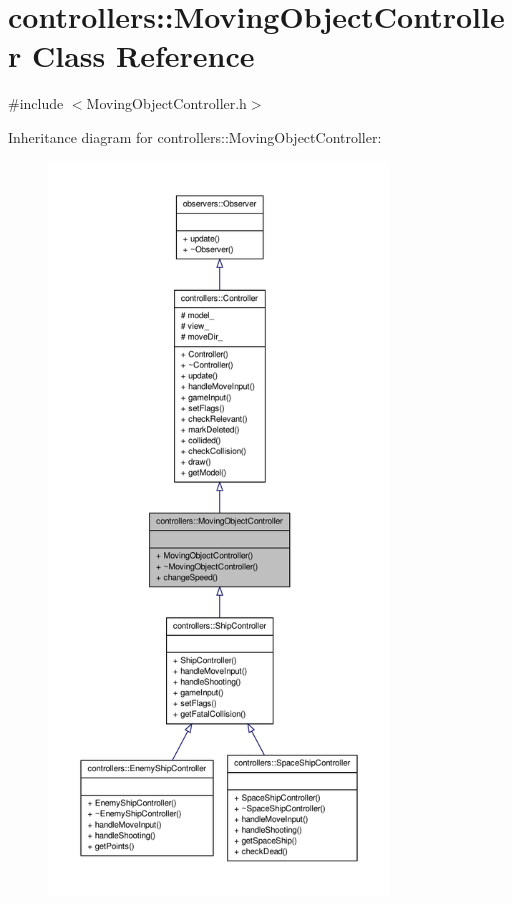\hypertarget{classcontrollers_1_1MovingObjectController}{\section{controllers\-:\-:\-Moving\-Object\-Controller \-Class \-Reference}
\label{df/d02/classcontrollers_1_1MovingObjectController}
}


{\ttfamily \#include $<$\-Moving\-Object\-Controller.\-h$>$}



\-Inheritance diagram for controllers\-:\-:\-Moving\-Object\-Controller\-:\nopagebreak
\begin{figure}[H]
\begin{center}
\leavevmode
\includegraphics[height=550pt]{d5/d2b/classcontrollers_1_1MovingObjectController__inherit__graph}
\end{center}
\end{figure}


